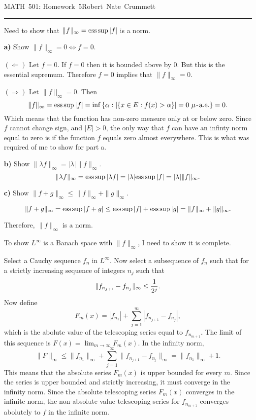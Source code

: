 


\def\reals{I\kern-4pt R}
\def\nats{I\kern-4pt N}
\let\oldexists\exists\def\exists{\oldexists\;}
\let\oldforall\forall\def\forall{\oldforall\,}
\def\qed{\vrule height 6pt width 6pt depth 0pt}
\def\esssup{{\rm ess}\sup}
\def\almosteverywhere{\,\,\mu\hbox{\kern1pt\rm-\kern1pt a.e.}}
\parindent 0pt
\parskip 2mm


MATH~501: Homework~5\hfill Robert~Nate~Crummett
\smallskip
\hrule



Need to show that $\|f\|_\infty=\esssup|f|$ is a norm.


{\bf a)} Show $\|f\|_\infty=0\Leftrightarrow f=0$. 

$(\Leftarrow)$ Let $f=0$.
If $f=0$ then it is bounded above by $0$.
But this is the essential supremum.
Therefore $f=0$ implies that $\|f\|_\infty=0$.

$(\Rightarrow)$ Let $\|f\|_\infty=0$.
Then 
$$\|f\|_\infty=\esssup|f|=\inf\left\{\alpha:\left|\left\{x\in E:f(x)>\alpha\right\}\right|=0\almosteverywhere\right\}=0.$$
Which means that the function has non-zero measure only at or below zero.
Since $f$ cannot change sign, and $|E|>0$, the only way that $f$ can have an infinty norm equal to zero is if the function $f$ equals zero almost everywhere.
This is what was required of me to show for part a.

{\bf b)} Show $\|\lambda f\|_\infty=|\lambda|\|f\|_\infty$. 
$$\|\lambda f\|_\infty=\esssup|\lambda f|=|\lambda|\esssup|f|=|\lambda|\|f\|_\infty.$$

{\bf c)} Show $\|f+g\|_\infty\leq\|f\|_\infty+\|g\|_\infty$.

$$\|f+g\|_\infty=\esssup|f+g|\leq\esssup|f|+\esssup|g|=\|f\|_\infty+\|g\|_\infty.$$

Therefore, $\|f\|_\infty$ is a norm.\hfill\qed\kern3pt


To show $L^\infty$ is a Banach space with $\|f\|_\infty$, I need to show it is complete.

Select a Cauchy sequence $f_n$ in $L^\infty$.
Now select a subsequence of $f_n$ such that for a strictly increasing sequence of integers $n_j$ such that
$$\|f_{n_{j+1}}-f_{n_j}\|_\infty\leq{1\over2^j}.$$
Now define
$$F_m(x)=|f_{n_1}|+\sum^m_{j=1}|f_{n_{j+1}}-f_{n_j}|,$$
which is the abolute value of the telescoping series equal to $f_{n_{m+1}}$.
The limit of this sequence is $F(x)=\lim_{m\to\infty}F_m(x)$.
In the infinity norm,
$$\|F\|_\infty\leq\|f_{n_1}\|_\infty+\sum_{j=1}^\infty\|f_{n_{j+1}}-f_{n_j}\|_\infty=\|f_{n_1}\|_\infty+1.$$
This means that the absolute series $F_m(x)$ is upper bounded for every $m$.
Since the series is upper bounded and strictly increasing, it must converge in the infinity norm.
Since the absolute telescoping series $F_m(x)$ converges in the infinite norm, the non-absolute value telescoping series for $f_{n_{m+1}}$ converges abolutely to $f$ in the infinite norm.
\bye
